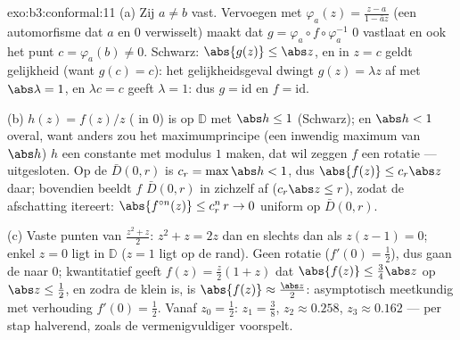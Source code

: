\begin{solution}{exo:b3:conformal:11}
(a) Zij $a \neq b$ vast. Vervoegen met $\varphi_a(z) = \frac{z -
a}{1 - \bar az}$ (een automorfisme dat $a$ en $0$ verwisselt)
maakt dat $g = \varphi_a\circ f\circ\varphi_a^{-1}$ $0$ vastlaat
en ook het punt $c = \varphi_a(b) \neq 0$. Schwarz: $\abs{g(z)}
\leq \abs z$, en in $z = c$ geldt gelijkheid (want $g(c) = c$):
het gelijkheidsgeval dwingt $g(z) = \lambda z$ af met
$\abs\lambda = 1$, en $\lambda c = c$ geeft $\lambda = 1$: dus $g
= \mathrm{id}$ en $f = \mathrm{id}$.

(b) $h(z) = f(z)/z$ ( in $0$) is 
op $\mathbb D$ met $\abs h \leq 1$ (Schwarz); en $\abs h < 1$
overal, want anders zou het maximumprincipe (een inwendig maximum
van $\abs h$) $h$ een constante met modulus $1$ maken, dat wil
zeggen $f$ een rotatie --- uitgesloten. Op de  $\bar
D(0,r)$ is $c_r = \max\abs h < 1$, dus $\abs{f(z)} \leq c_r\abs
z$ daar; bovendien beeldt $f$ $\bar D(0,r)$ in zichzelf af
($c_r\abs z \leq r$), zodat de afschatting itereert:
$\abs{f^{\circ n}(z)} \leq c_r^n\,r \to 0$ uniform op $\bar D(0,
r)$.

(c) Vaste punten van $\frac{z^2 + z}2$: $z^2 + z = 2z$ dan en
slechts dan als $z(z - 1) = 0$; enkel $z = 0$ ligt in $\mathbb D$
($z = 1$ ligt op de rand). Geen rotatie ($f'(0) = \frac12$), dus
gaan de  naar $0$; kwantitatief geeft $f(z) = \frac z2(1 +
z)$ dat $\abs{f(z)} \leq \frac{3}{4}\abs z$ op $\abs z \leq
\frac12$, en zodra de  klein is, is $\abs{f(z)} \approx
\frac{\abs z}2$: asymptotisch meetkundig met verhouding $f'(0) =
\frac12$. Vanaf $z_0 = \frac12$: $z_1 = \frac38$, $z_2 \approx
0.258$, $z_3 \approx 0.162$ --- per stap halverend, zoals de
vermenigvuldiger voorspelt.
\end{solution}

